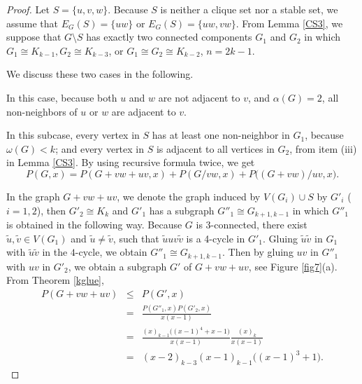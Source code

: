 \documentclass[12pt]{article}
\theoremstyle{definition}
\begin{document}
\begin{proof} Let $S=\{u,v,w\}$. Because $S$ is neither a clique set nor a stable set, we assume that $E_{G}(S)=\{uw\}$ or $E_{G}(S)=\{uw,vw\}$. From Lemma \ref{CS3}, we suppose that $G\setminus S$ has exactly two connected components $G_1$ and $G_2$ in which $G_1\cong K_{k-1}, G_2\cong K_{k-3}$, or $G_1\cong G_2\cong K_{k-2}$, $n=2k-1$.

We discuss these two cases in the following.


In this case, because both $u$ and $w$ are not adjacent to $v$, and $\alpha(G)=2$, all non-neighbors of $u$ or $w$ are adjacent to $v$.


In this subcase, every vertex in $S$ has at least one non-neighbor in $G_1$, because $\omega(G)< k$;
and every vertex in $S$ is adjacent to all vertices in $G_2$, from item (iii) in Lemma \ref{CS3}.
By using recursive formula twice, we get \begin{equation}\label{AC1}P(G,x)=P(G+vw+uv,x)+P(G/vw,x)+P\big((G+vw)/uv,x\big).\end{equation}

In the graph $G+vw+uv$, we denote the graph induced by $V(G_i)\cup S$ by $G'_i$ ($i=1,2$), then $G'_2\cong K_k$ and $G'_1$ has a subgraph
$G''_1\cong G_{k+1,k-1}$ in which $G''_1$ is obtained in the following way. Because $G$ is $3$-connected, there exist $\tilde{u},\tilde{v}\in V(G_1)$ and $\tilde{u}\neq \tilde{v}$, such that $\tilde{u}uv\tilde{v}$ is a 4-cycle in $G'_1$.  Gluing
$\tilde{u}\tilde{v}$ in $G_1$ with $\tilde{u}\tilde{v}$ in the $4$-cycle, we obtain $G''_1\cong G_{k+1,k-1}$. Then by gluing
$uv$ in $G''_1$ with $uv$ in $G'_2$, we obtain a subgraph $G'$ of $G+vw+uv$, see Figure \ref{fig7}(a). From Theorem \ref{kglue},
\begin{eqnarray}\label{AA}P(G+vw+uv)&\leq & P(G',x)\nonumber\\
&= &\frac{P(G''_1,x)P(G'_2,x)}{x(x-1)}\nonumber\\
&=&\frac{(x)_{k-1}\big((x-1)^4+x-1\big)}{x(x-1)}\frac{(x)_{k}}{x(x-1)}\nonumber\\
&=&(x-2)_{k-3}(x-1)_{k-1}\big((x-1)^3+1\big).
\end{eqnarray}


\end{proof}
\end{document}
